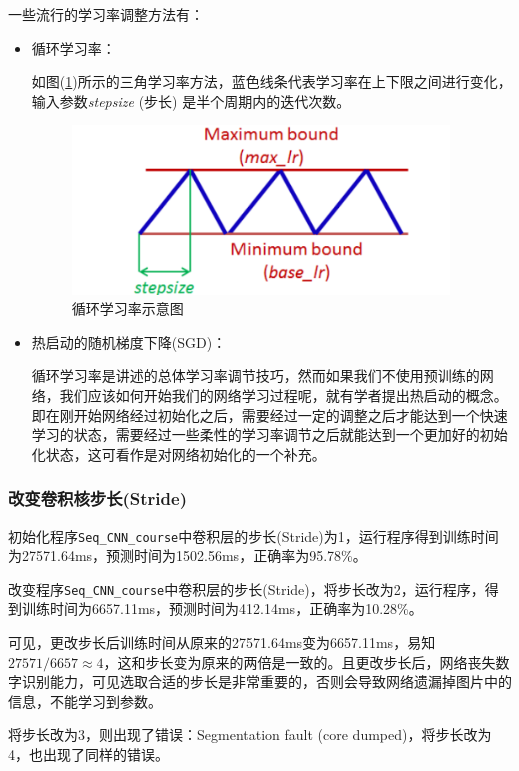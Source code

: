 \documentclass[UTF-8, a4paper, 12pt]{ctexart}
\begin{document}
一些流行的学习率调整方法有：
\begin{itemize}
    \item 循环学习率：
    
    如图(\ref{f9})所示的三角学习率方法，蓝色线条代表学习率在上下限之间进行变化，输入参数\textit{stepsize} (步长) 是半个周期内的迭代次数。  
    \begin{figure}[htbp]
        \centering
        \includegraphics[width=10cm]{fig/f9.png}
        \caption{循环学习率示意图}
        \label{f9}
    \end{figure}

    \item 热启动的随机梯度下降(SGD)：
    
    循环学习率是讲述的总体学习率调节技巧，然而如果我们不使用预训练的网络，我们应该如何开始我们的网络学习过程呢，就有学者提出热启动的概念。即在刚开始网络经过初始化之后，需要经过一定的调整之后才能达到一个快速学习的状态，需要经过一些柔性的学习率调节之后就能达到一个更加好的初始化状态，这可看作是对网络初始化的一个补充。
\end{itemize}

\subsubsection{改变卷积核步长(Stride)}
初始化程序\colorbox[gray]{0.9}{\texttt{Seq\_CNN\_course}}中卷积层的步长(Stride)为1，运行程序得到训练时间为27571.64ms，预测时间为1502.56ms，正确率为95.78\%。

改变程序\colorbox[gray]{0.9}{\texttt{Seq\_CNN\_course}}中卷积层的步长(Stride)，将步长改为2，运行程序，得到训练时间为6657.11ms，预测时间为412.14ms，正确率为10.28\%。



可见，更改步长后训练时间从原来的27571.64ms变为6657.11ms，易知$27571/6657\approx 4$，这和步长变为原来的两倍是一致的。且更改步长后，网络丧失数字识别能力，可见选取合适的步长是非常重要的，否则会导致网络遗漏掉图片中的信息，不能学习到参数。

将步长改为3，则出现了错误：Segmentation fault (core dumped)，将步长改为4，也出现了同样的错误。
\end{document}
